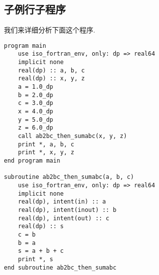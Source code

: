 \subsection{子例行子程序} 

我们来详细分析下面这个程序. 
\begin{lstlisting} 
program main
    use iso_fortran_env, only: dp => real64
    implicit none
    real(dp) :: a, b, c
    real(dp) :: x, y, z
    a = 1.0_dp
    b = 2.0_dp
    c = 3.0_dp
    x = 4.0_dp
    y = 5.0_dp
    z = 6.0_dp
    call ab2bc_then_sumabc(x, y, z)
    print *, a, b, c
    print *, x, y, z
end program main

subroutine ab2bc_then_sumabc(a, b, c)
    use iso_fortran_env, only: dp => real64
    implicit none
    real(dp), intent(in) :: a
    real(dp), intent(inout) :: b
    real(dp), intent(out) :: c
    real(dp) :: s
    c = b
    b = a
    s = a + b + c
    print *, s
end subroutine ab2bc_then_sumabc
\end{lstlisting} 
